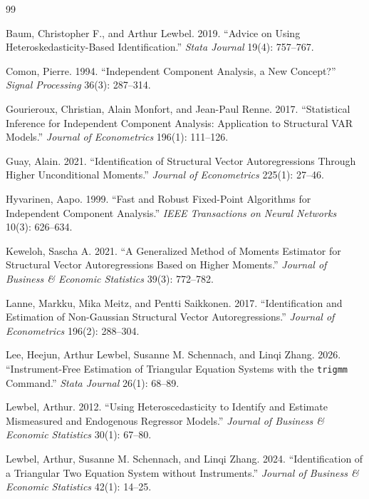 \documentclass[11pt]{article}
\theoremstyle{plain}
\theoremstyle{definition}
\theoremstyle{remark}
\begin{document}
\begin{thebibliography}{99}

Baum, Christopher F., and Arthur Lewbel. 2019. ``Advice on Using
Heteroskedasticity-Based Identification.'' \emph{Stata Journal} 19(4): 757--767.

Comon, Pierre. 1994. ``Independent Component Analysis, a New Concept?''
\emph{Signal Processing} 36(3): 287--314.

Gourieroux, Christian, Alain Monfort, and Jean-Paul Renne. 2017. ``Statistical
Inference for Independent Component Analysis: Application to Structural VAR
Models.'' \emph{Journal of Econometrics} 196(1): 111--126.

Guay, Alain. 2021. ``Identification of Structural Vector Autoregressions Through
Higher Unconditional Moments.'' \emph{Journal of Econometrics} 225(1): 27--46.

Hyvarinen, Aapo. 1999. ``Fast and Robust Fixed-Point Algorithms for Independent
Component Analysis.'' \emph{IEEE Transactions on Neural Networks} 10(3): 626--634.

Keweloh, Sascha A. 2021. ``A Generalized Method of Moments Estimator for
Structural Vector Autoregressions Based on Higher Moments.'' \emph{Journal of
Business \& Economic Statistics} 39(3): 772--782.

Lanne, Markku, Mika Meitz, and Pentti Saikkonen. 2017. ``Identification and
Estimation of Non-Gaussian Structural Vector Autoregressions.'' \emph{Journal of
Econometrics} 196(2): 288--304.

Lee, Heejun, Arthur Lewbel, Susanne M. Schennach, and Linqi Zhang. 2026.
``Instrument-Free Estimation of Triangular Equation Systems with the
\texttt{trigmm} Command.'' \emph{Stata Journal} 26(1): 68--89.

Lewbel, Arthur. 2012. ``Using Heteroscedasticity to Identify and Estimate
Mismeasured and Endogenous Regressor Models.'' \emph{Journal of Business \&
Economic Statistics} 30(1): 67--80.

Lewbel, Arthur, Susanne M. Schennach, and Linqi Zhang. 2024. ``Identification of
a Triangular Two Equation System without Instruments.'' \emph{Journal of Business
\& Economic Statistics} 42(1): 14--25.


\end{thebibliography}
\end{document}
